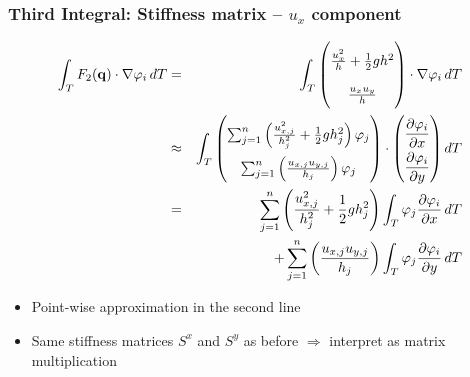 \documentclass{beamer}
\newcommand{\pd}[2]{\dfrac{\partial #1}{\partial #2}}
\renewcommand{\phi}{\varphi}
\begin{document}
\begin{frame}
  \frametitle{Third Integral: Stiffness matrix -- $u_x$ component}
  \begin{eqnarray*}
    \label{sec:third-integral-second-line-1}
    \int_T F_2(\mathbf{q}) \cdot \nabla \phi_i \, dT & = &
    \int_T
    \begin{pmatrix}
      \frac{u_x^2}{h} + \frac{1}{2} g h^2 \\ \frac{u_x u_y}{h}
    \end{pmatrix}
    \cdot \nabla \phi_i \, dT \\
    \label{sec:third-integral-second-line-2}
    & \approx &
    \int_T 
    \begin{pmatrix}
      \sum_{j=1}^n \left(\frac{u_{x,j}^2}{h_j^2} + \frac{1}{2} g h_j^2\right) \phi_j \\
      \sum_{j=1}^n \left(\frac{u_{x,j} u_{y,j}}{h_j}\right) \phi_j \\
    \end{pmatrix}
    \cdot 
    {
      \renewcommand{\arraystretch}{2}
      \begin{pmatrix}
        \pd{\phi_i}{x} \\
        \pd{\phi_i}{y} 
      \end{pmatrix} dT 
    } \\
    & = & \nonumber \sum_{j=1}^n \left(\frac{u_{x,j}^2}{h_j^2} + \frac{1}{2} g h_j^2\right) \int_T \phi_j \pd{\phi_i}{x} \, dT \\ 
    & {} & + \nonumber \sum_{j=1}^n \left(\frac{u_{x,j} u_{y,j}}{h_j}\right) \int_T \phi_j \pd{\phi_i}{y} \, dT
  \end{eqnarray*}
  \begin{itemize}
  \item Point-wise approximation in the second line
  \item Same stiffness matrices $S^x$ and $S^y$ as before $\Rightarrow$ interpret as matrix multiplication
  \end{itemize}
\end{frame}
\end{document}
